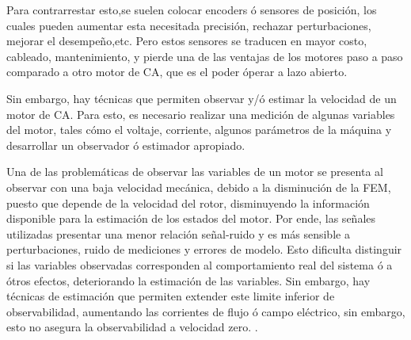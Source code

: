 Para contrarrestar esto,se suelen colocar encoders ó sensores de posición, los cuales pueden aumentar esta necesitada precisión, rechazar perturbaciones, mejorar el desempeño,etc. Pero estos sensores se traducen en mayor costo, cableado, mantenimiento, y pierde una de las ventajas de los motores paso a paso comparado a otro motor de CA, que es el poder óperar a lazo abierto.

%


%
%

Sin embargo, hay técnicas que permiten observar y/ó estimar la velocidad de un motor de CA. Para esto, es necesario realizar una medición de algunas variables del motor, tales cómo el voltaje, corriente, algunos parámetros de la máquina y desarrollar un observador ó estimador apropiado.

%
%
%

Una de las problemáticas de observar las variables de un motor se presenta al observar con una baja velocidad mecánica, debido a la disminución de la FEM, puesto que depende de la velocidad del rotor, disminuyendo la información disponible para la estimación de los estados del motor. Por ende, las señales utilizadas presentar una menor relación señal-ruido y es más sensible a perturbaciones, ruido de mediciones y errores de modelo. Esto dificulta distinguir si las variables observadas corresponden al comportamiento real del sistema ó a ótros efectos, deteriorando la estimación de las variables. Sin embargo, hay técnicas de estimación que permiten extender este limite inferior de observabilidad, aumentando las corrientes de flujo  ó campo eléctrico, sin embargo, esto no asegura la observabilidad a velocidad zero. \cite{wangParameterRobustnessImprovement2026}.

